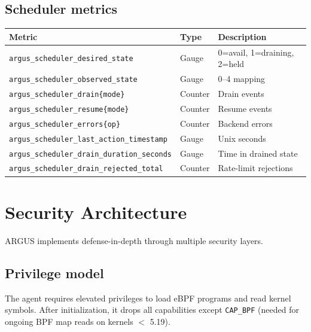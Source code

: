\documentclass[11pt]{article}
\begin{document}
\subsection{Scheduler metrics}

\begin{center}
\small
\begin{tabular}{lll}
\toprule
Metric & Type & Description \\
\midrule
\texttt{argus\_scheduler\_desired\_state}            & Gauge   & 0=avail, 1=draining, 2=held \\
\texttt{argus\_scheduler\_observed\_state}            & Gauge   & 0--4 mapping \\
\texttt{argus\_scheduler\_drain\{mode\}}              & Counter & Drain events \\
\texttt{argus\_scheduler\_resume\{mode\}}             & Counter & Resume events \\
\texttt{argus\_scheduler\_errors\{op\}}               & Counter & Backend errors \\
\texttt{argus\_scheduler\_last\_action\_timestamp}    & Gauge   & Unix seconds \\
\texttt{argus\_scheduler\_drain\_duration\_seconds}   & Gauge   & Time in drained state \\
\texttt{argus\_scheduler\_drain\_rejected\_total}     & Counter & Rate-limit rejections \\
\bottomrule
\end{tabular}
\end{center}


\section{Security Architecture}
\label{sec:security}

ARGUS implements defense-in-depth through multiple security layers.

\subsection{Privilege model}

The agent requires elevated privileges to load eBPF programs and read
kernel symbols. After initialization, it drops all capabilities except
\texttt{CAP\_BPF} (needed for ongoing BPF map reads on kernels $<$ 5.19).
\end{document}
